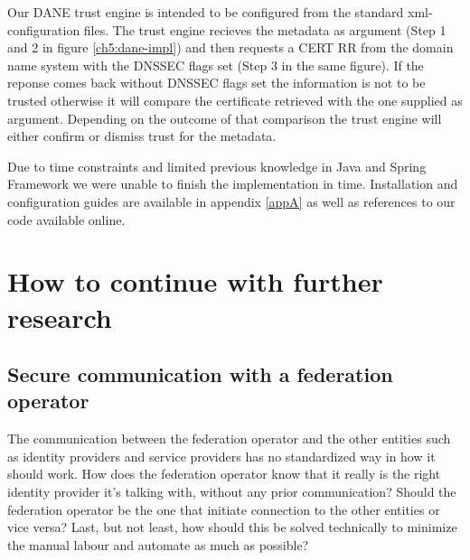 Our DANE trust engine is intended to be configured from the standard xml-configuration files. 
The trust engine recieves the metadata as argument (Step 1 and 2 in figure \ref{ch5:dane-impl}) and then requests a CERT RR from the domain name system with the DNSSEC flags set (Step 3 in the same figure). 
If the reponse comes back without DNSSEC flags set the information is not to be trusted otherwise it will compare the certificate retrieved with the one supplied as argument.
Depending on the outcome of that comparison the trust engine will either confirm or dismiss trust for the metadata.

Due to time constraints and limited previous knowledge in Java and Spring Framework we were unable to finish the implementation in time.
Installation and configuration guides are available in appendix \ref{appA} as well as references to our code available online.





\section{How to continue with further research}
\subsection{Secure communication with a federation operator}
The communication between the federation operator and the other entities such as identity providers and service providers has no standardized way in how it should work.
How does the federation operator know that it really is the right identity provider it's talking with, without any prior communication?
Should the federation operator be the one that initiate connection to the other entities or vice versa?
Last, but not least, how should this be solved technically to minimize the manual labour and automate as much as possible?

